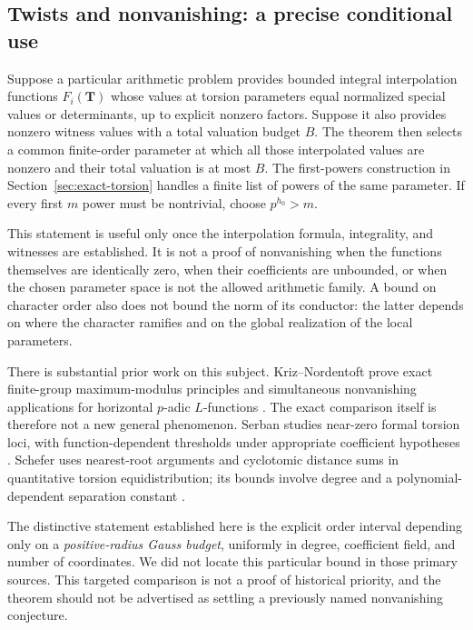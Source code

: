 \subsection{Twists and nonvanishing: a precise conditional use}

Suppose a particular arithmetic problem provides bounded integral
interpolation functions \(F_i(\mathbf T)\) whose values at torsion
parameters equal normalized special values or determinants, up to
explicit nonzero factors. Suppose it also provides nonzero witness values
with a total valuation budget \(B\). The theorem then selects a common
finite-order parameter at which all those interpolated values are nonzero
and their total valuation is at most \(B\). The first-powers construction
in Section~\ref{sec:exact-torsion} handles a finite list of powers of the
same parameter. If every first \(m\) power must be nontrivial, choose
\(p^{h_0}>m\).

This statement is useful only once the interpolation formula, integrality,
and witnesses are established. It is not a proof of nonvanishing when
the functions themselves are identically zero, when their coefficients
are unbounded, or when the chosen parameter space is not the allowed
arithmetic family. A bound on character order also does not bound the
norm of its conductor: the latter depends on where the character
ramifies and on the global realization of the local parameters.

There is substantial prior work on this subject. Kriz--Nordentoft
prove exact finite-group maximum-modulus principles and simultaneous
nonvanishing applications for horizontal \(p\)-adic \(L\)-functions
\cite{kn}. The exact comparison itself is therefore not a new general
phenomenon. Serban studies near-zero formal torsion loci, with
function-dependent thresholds under appropriate coefficient hypotheses
\cite{serban}. Schefer uses nearest-root arguments and cyclotomic distance
sums in quantitative torsion equidistribution; its bounds involve degree
and a polynomial-dependent separation constant \cite{schefer}.

The distinctive statement established here is the explicit order interval
depending only on a \emph{positive-radius Gauss budget}, uniformly in degree,
coefficient field, and number of coordinates. We did not locate this
particular bound in those primary sources. This targeted comparison is
not a proof of historical priority, and the theorem should not be
advertised as settling a previously named nonvanishing conjecture.

